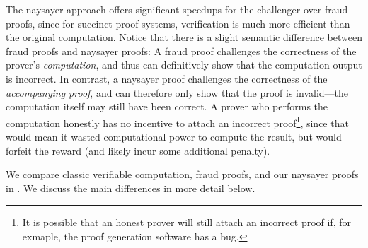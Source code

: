 
The naysayer approach offers significant speedups for the challenger over fraud proofs, since for succinct proof systems, verification is much more efficient than the original computation. 
Notice that there is a slight semantic difference between fraud proofs and naysayer proofs: A fraud proof challenges the correctness of the prover's \emph{computation}, and thus can definitively show that the computation output is incorrect. In contrast, a naysayer proof challenges the correctness of the \emph{accompanying proof}, and can therefore only show that the proof is invalid---the computation itself may still have been correct. A prover who performs the computation honestly has no incentive to attach an incorrect proof\footnote{It is possible that an honest prover will still attach an incorrect proof if, for exmaple, the proof generation software has a bug.}, since that would mean it wasted computational power to compute the result, but would forfeit the reward (and likely incur some additional penalty).





We compare classic verifiable computation, fraud proofs, and our naysayer proofs in . We discuss the main differences in more detail below.

